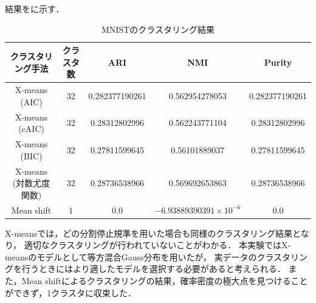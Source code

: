 結果をに示す．

\begin{table}[htb]
  \centering
  \caption{MNISTのクラスタリング結果}
  \label{table:mnist}
  \begin{tabular}{|c|c|c|c|c|} \hline
    クラスタリング手法 & クラスタ数 & ARI & NMI & Purity \\\hline
    X-means (AIC) & 32 & 0.282377190261 & 0.562954278053 & 0.282377190261\\
    X-means (cAIC) & 32 & 0.28312802996 & 0.562243771104 & 0.28312802996\\
    X-means (BIC) & 32 & 0.27811599645 & 0.56101889037 & 0.27811599645\\
    X-means (対数尤度関数)& 32 & 0.28736538966 & 0.569692653863 & 0.28736538966\\
    Mean shift & 1 & 0.0 & $-6.93889390391 \times 10^{-6}$ & 0.0\\\hline
  \end{tabular}
\end{table}

X-meansでは，どの分割停止規準を用いた場合も同様のクラスタリング結果となり，
適切なクラスタリングが行われていないことがわかる．
本実験ではX-meansのモデルとして等方混合Gauss分布を用いたが，
実データのクラスタリングを行うときにはより適したモデルを選択する必要があると考えられる．
また，Mean shiftによるクラスタリングの結果，確率密度の極大点を見つけることができず，1クラスタに収束した．

